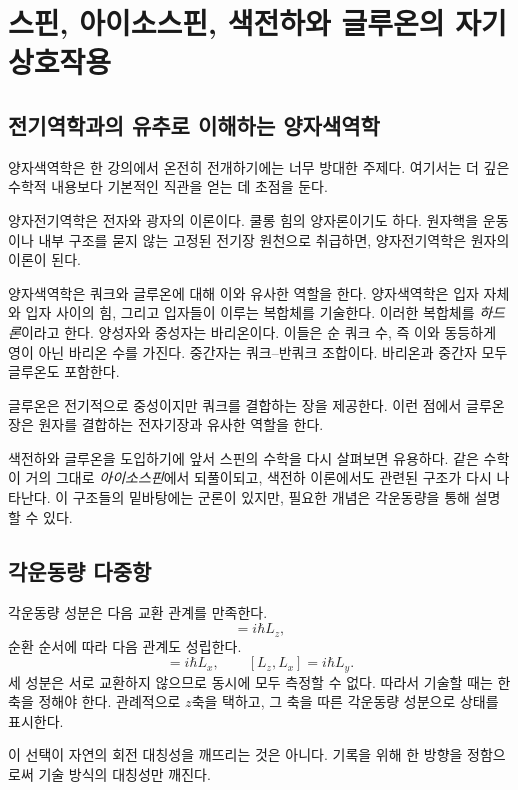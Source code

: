 \chapter{스핀, 아이소스핀, 색전하와 글루온의 자기 상호작용}

\section{전기역학과의 유추로 이해하는 양자색역학}

양자색역학은 한 강의에서 온전히 전개하기에는 너무 방대한 주제다. 여기서는 더 깊은 수학적 내용보다 기본적인 직관을 얻는 데 초점을 둔다.

양자전기역학은 전자와 광자의 이론이다. 쿨롱 힘의 양자론이기도 하다. 원자핵을 운동이나 내부 구조를 묻지 않는 고정된 전기장 원천으로 취급하면, 양자전기역학은 원자의 이론이 된다.

양자색역학은 쿼크와 글루온에 대해 이와 유사한 역할을 한다. 양자색역학은 입자 자체와 입자 사이의 힘, 그리고 입자들이 이루는 복합체를 기술한다. 이러한 복합체를 \emph{하드론}이라고 한다. 양성자와 중성자는 바리온이다. 이들은 순 쿼크 수, 즉 이와 동등하게 영이 아닌 바리온 수를 가진다. 중간자는 쿼크--반쿼크 조합이다. 바리온과 중간자 모두 글루온도 포함한다.

글루온은 전기적으로 중성이지만 쿼크를 결합하는 장을 제공한다. 이런 점에서 글루온 장은 원자를 결합하는 전자기장과 유사한 역할을 한다.

색전하와 글루온을 도입하기에 앞서 스핀의 수학을 다시 살펴보면 유용하다. 같은 수학이 거의 그대로 \emph{아이소스핀}에서 되풀이되고, 색전하 이론에서도 관련된 구조가 다시 나타난다. 이 구조들의 밑바탕에는 군론이 있지만, 필요한 개념은 각운동량을 통해 설명할 수 있다.

\section{각운동량 다중항}

각운동량 성분은 다음 교환 관계를 만족한다.
\begin{equation}
[L_x,L_y]=i\hbar L_z,
\end{equation}
순환 순서에 따라 다음 관계도 성립한다.
\begin{equation}
[L_y,L_z]=i\hbar L_x,
\qquad
[L_z,L_x]=i\hbar L_y.
\end{equation}
세 성분은 서로 교환하지 않으므로 동시에 모두 측정할 수 없다. 따라서 기술할 때는 한 축을 정해야 한다. 관례적으로 \(z\)축을 택하고, 그 축을 따른 각운동량 성분으로 상태를 표시한다.

이 선택이 자연의 회전 대칭성을 깨뜨리는 것은 아니다. 기록을 위해 한 방향을 정함으로써 기술 방식의 대칭성만 깨진다.

